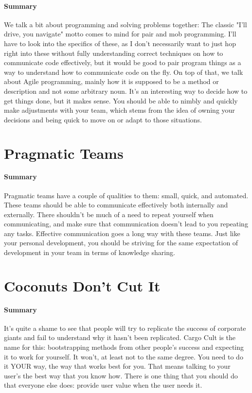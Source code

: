 \documentclass{article}
\begin{document}
    \paragraph{Summary} We talk a bit about programming and solving problems together: The classic "I'll drive, you navigate" motto comes to mind for pair and mob programming. I'll have to look into the specifics of these, as I don't necessarily want to just hop right into these without fully understanding correct techniques on how to communicate code effectively, but it would be good to pair program things as a way to understand how to communicate code on the fly. On top of that, we talk about Agile programming, mainly how it is supposed to be a method or description and not some arbitrary noun. It's an interesting way to decide how to get things done, but it makes sense. You should be able to nimbly and quickly make adjustments with your team, which stems from the idea of owning your decisions and being quick to move on or adapt to those situations.

\section{Pragmatic Teams}
    \paragraph{Summary} Pragmatic teams have a couple of qualities to them: small, quick, and automated. These teams should be able to communicate effectively both internally and externally. There shouldn't be much of a need to repeat yourself when communicating, and make sure that communication doesn't lead to you repeating any tasks. Effective communication goes a long way with these teams. Just like your personal development, you should be striving for the same expectation of development in your team in terms of knowledge sharing.

\section{Coconuts Don't Cut It}
    \paragraph{Summary} It's quite a shame to see that people will try to replicate the success of corporate giants and fail to understand why it hasn't been replicated. Cargo Cult is the name for this: bootstrapping methods from other people's success and expecting it to work for yourself. It won't, at least not to the same degree. You need to do it YOUR way, the way that works best for you. That means talking to your user's the best way that you know how. There is one thing that you should do that everyone else does: provide user value when the user needs it. 
\end{document}
